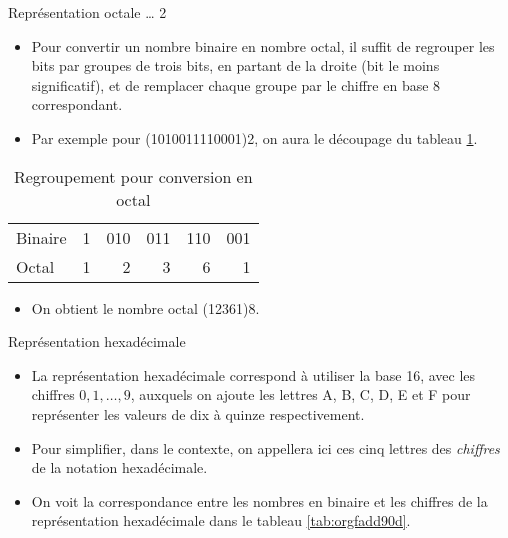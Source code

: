 \documentclass[presentation]{beamer}
\begin{document}
\begin{frame}[label={sec:orge620a0f}]{Représentation octale \ldots{} 2}
\begin{itemize}
\item Pour convertir un nombre binaire en nombre octal, il suffit de regrouper les bits par groupes de trois bits, en partant de la droite (bit le moins significatif), et de remplacer chaque groupe par le chiffre en base 8 correspondant.

\item Par exemple pour (1010011110001)2, on aura le découpage du tableau \ref{tab:org211dc88}.
\end{itemize}

\begin{table}[htbp]
\caption{\label{tab:org211dc88}Regroupement pour conversion en octal}
\centering
\begin{tabular}{lrrrrr}
 &  &  &  &  & \\
\hline
Binaire & 1 & 010 & 011 & 110 & 001\\
Octal & 1 & 2 & 3 & 6 & 1\\
\end{tabular}
\end{table}

\begin{itemize}
\item On obtient le nombre octal (12361)8.
\end{itemize}
\end{frame}

\begin{frame}[label={sec:org71fc0ec}]{Représentation hexadécimale}
\begin{itemize}
\item La représentation hexadécimale correspond à utiliser la base 16, avec les chiffres \(0, 1, \ldots, 9\), auxquels on ajoute les lettres A, B, C, D, E et F pour représenter les valeurs de dix à quinze respectivement.

\item Pour simplifier, dans le contexte, on appellera ici ces cinq lettres des \emph{chiffres} de la notation hexadécimale.

\item On voit la correspondance entre les nombres en binaire et les chiffres de la représentation hexadécimale dans le tableau \ref{tab:orgfadd90d}.
\end{itemize}
\end{frame}
\end{document}
